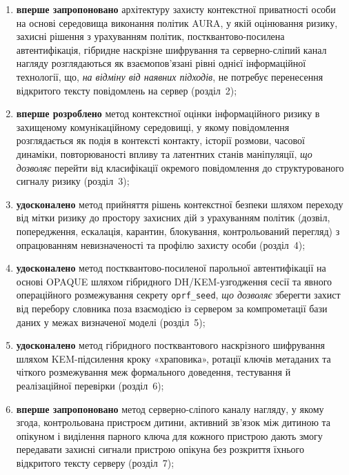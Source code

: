 \begin{enumerate}
  \item \textbf{вперше запропоновано} архітектуру захисту контекстної приватності особи на основі середовища виконання політик AURA, у якій оцінювання ризику, захисні рішення з урахуванням політик, постквантово-посилена автентифікація, гібридне наскрізне шифрування та серверно-сліпий канал нагляду розглядаються як взаємопов'язані рівні однієї інформаційної технології, що, \emph{на відміну від наявних підходів}, не потребує перенесення відкритого тексту повідомлень на сервер (розділ~2);

  \item \textbf{вперше розроблено} метод контекстної оцінки інформаційного ризику в захищеному комунікаційному середовищі, у якому повідомлення розглядається як подія в контексті контакту, історії розмови, часової динаміки, повторюваності впливу та латентних станів маніпуляції, \emph{що дозволяє} перейти від класифікації окремого повідомлення до структурованого сигналу ризику (розділ~3);

  \item \textbf{удосконалено} метод прийняття рішень контекстної безпеки шляхом переходу від мітки ризику до простору захисних дій з урахуванням політик (дозвіл, попередження, ескалація, карантин, блокування, контрольований перегляд) з опрацюванням невизначеності та профілю захисту особи (розділ~4);

  \item \textbf{удосконалено} метод постквантово-посиленої парольної автентифікації на основі OPAQUE шляхом гібридного DH/KEM-узгодження сесії та явного операційного розмежування секрету \texttt{oprf\_seed}, \emph{що дозволяє} зберегти захист від перебору словника поза взаємодією із сервером за компрометації бази даних у межах визначеної моделі (розділ~5);

  \item \textbf{удосконалено} метод гібридного постквантового наскрізного шифрування шляхом KEM-підсилення кроку «храповика», ротації ключів метаданих та чіткого розмежування меж формального доведення, тестування й реалізаційної перевірки (розділ~6);

  \item \textbf{вперше запропоновано} метод серверно-сліпого каналу нагляду, у якому згода, контрольована пристроєм дитини, активний зв'язок між дитиною та опікуном і виділення парного ключа для кожного пристрою дають змогу передавати захисні сигнали пристрою опікуна без розкриття їхнього відкритого тексту серверу (розділ~7);


\end{enumerate}
